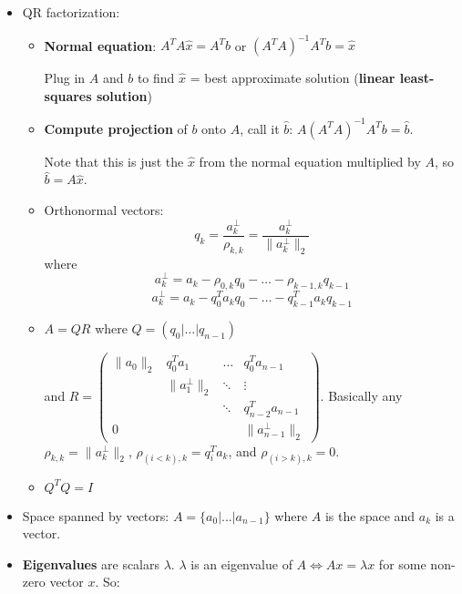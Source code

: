 \documentclass[a4paper]{article}
\begin{document}
\begin{itemize}
        \item QR factorization:
            \begin{itemize}
                \item \textbf{Normal equation}: \(A^TA\hat{x}=A^Tb\) or \((A^TA)^{-1}A^Tb=\hat{x}\)
                
                Plug in \(A\) and \(b\) to find \(\hat{x}\) = best approximate solution (\textbf{linear least-squares solution}) 
                
                \item \textbf{Compute projection} of \( b \) onto \(A\), call it \(\hat{b}\): \(A(A^TA)^{−1}A^Tb=\hat{b}\).
                
                Note that this is just the \(\hat{x}\) from the normal equation multiplied by \(A\), so \(\hat{b}=A\hat{x}\).
                
                \item Orthonormal vectors: $$q_k=\frac{a^\bot _k}{\rho _{k,k}}=\frac{a^{\bot }_k}{\parallel a^{\bot }_k \parallel _2}$$ where
                    $$a^\bot _k = a_k − \rho _{0,k}q_0− \dots −\rho _{k−1,k}q_{k−1}$$
                    $$a^\bot _k=a_k−q^T_0a_kq_0−\dots −q^T_{k−1}a_kq_{k−1}$$
                    
                \item \(A=QR\) where \(Q=(q_0 | \dots | q_{n-1})\)
                
                    and \(R=
                        \begin{pmatrix}
                        \parallel a_0 \parallel _2 & q_0^Ta_1 & \dots & q_0^Ta_{n-1} \\
                        & \parallel a_1^{\bot } \parallel _2 & \ddots & \vdots \\
                        & & \ddots & q_{n-2}^Ta_{n-1} \\
                        0 & & & \parallel a^{\bot }_{n-1} \parallel _2
                        \end{pmatrix}
                    \). Basically any \(\rho _{k,k}=\parallel a_k^{\bot } \parallel _2 \),
                    \(\rho _{(i<k),k}=q_i^Ta_k\), and \(\rho _{(i>k),k}=0\).
                \item \(Q^TQ=I\)
            \end{itemize}
        \item Space spanned by vectors: \(A=\{ a_0|\text{...}|a_{n−1}\} \) where \(A\) is the space and \(a_k\) is a vector.
        \item \textbf{Eigenvalues} are scalars \(\lambda \). \(\lambda\) is an eigenvalue of \(A \iff Ax = \lambda x\) for some non-zero vector \(x\). So:
        

\end{itemize}
\end{document}
